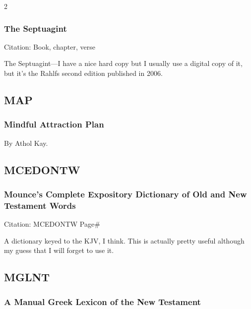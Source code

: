 \begin{multicols}{2}
		\subsubsection*{The Septuagint}
		
			Citation:
				Book, chapter, verse
				
			The Septuagint---I have a nice hard copy but I usually use a digital copy of it, but it's the Rahlfs second edition published in 2006.
			
	\subsection*{MAP}
	
		\subsubsection*{Mindful Attraction Plan}
		
			By Athol Kay.
			
	\subsection*{MCEDONTW}
	
		\subsubsection*{Mounce's Complete Expository Dictionary of Old and New Testament Words}
		
			Citation:
				MCEDONTW Page\#
				
			A dictionary keyed to the KJV, I think. This is actually pretty useful although my guess that I will forget to use it.
			
	\subsection*{MGLNT}
	
		\subsubsection*{A Manual Greek Lexicon of the New Testament}
		

\end{multicols}
